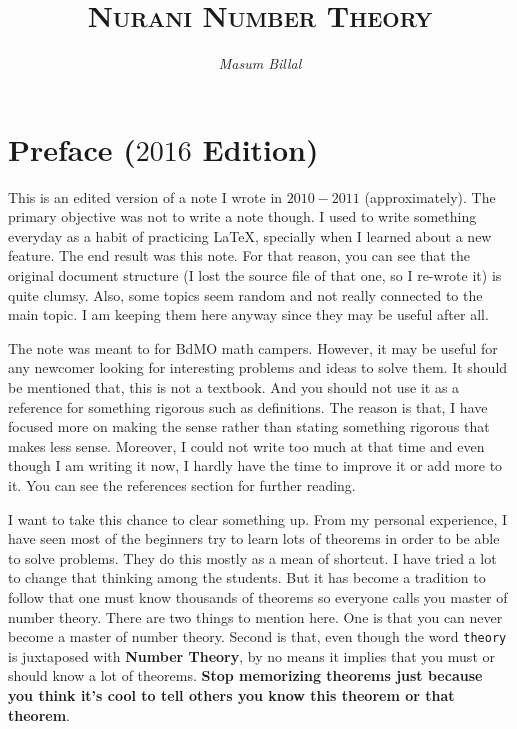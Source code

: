 \documentclass[a4paper, leqno]{article}
\author{\itshape Masum Billal}
\title{\scshape Nurani Number Theory}
\theoremstyle{definition}
\theoremstyle{remark}
\begin{document}
	\maketitle
	\titlepage
	\section*{Preface ($2016$ Edition)}
		This is an edited version of a note I wrote in $2010-2011$ (approximately). The primary objective was not to write a note though. I used to write something everyday as a habit of practicing \LaTeX, specially when I learned about a new feature. The end result was this note. For that reason, you can see that the original document structure (I lost the source file of that one, so I re-wrote it) is quite clumsy. Also, some topics seem random and not really connected to the main topic. I am keeping them here anyway since they may be useful after all.
		
		The note was meant to for BdMO math campers. However, it may be useful for any newcomer looking for interesting problems and ideas to solve them. It should be mentioned that, this is not a textbook. And you should not use it as a reference for something rigorous such as definitions. The reason is that, I have focused more on making the sense rather than stating something rigorous that makes less sense. Moreover, I could not write too much at that time and even though I am writing it now, I hardly have the time to improve it or add more to it. You can see the references section for further reading.
		
		I want to take this chance to clear something up. From my personal experience, I have seen most of the beginners try to learn lots of theorems in order to be able to solve problems. They do this mostly as a mean of shortcut. I have tried a lot to change that thinking among the students. But it has become a tradition to follow that one must know thousands of theorems so everyone calls you master of number theory. There are two things to mention here. One is that you can never become a master of number theory. Second is that, even though the word \texttt{theory} is juxtaposed with \textbf{Number Theory}, by no means it implies that you must or should know a lot of theorems. \textbf{Stop memorizing theorems just because you think it's cool to tell others you know this theorem or that theorem}.
		
\end{document}
